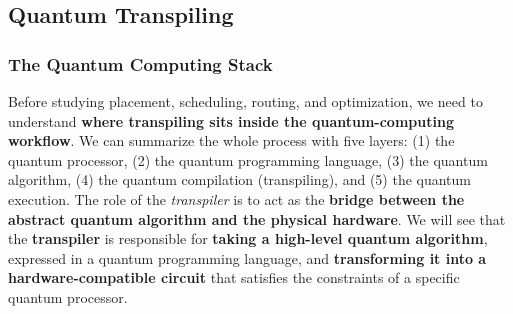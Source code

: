 \subsection{Quantum Transpiling}

\subsubsection{The Quantum Computing Stack}

Before studying placement, scheduling, routing, and optimization, we need to understand \textbf{where transpiling sits inside the quantum-computing workflow}. We can summarize the whole process with five layers: (1) the quantum processor, (2) the quantum programming language, (3) the quantum algorithm, (4) the quantum compilation (transpiling), and (5) the quantum execution. The role of the \emph{transpiler} is to act as the \textbf{bridge between the abstract quantum algorithm and the physical hardware}. We will see that the \textbf{transpiler} is responsible for \textbf{taking a high-level quantum algorithm}, expressed in a quantum programming language, and \textbf{transforming it into a hardware-compatible circuit} that satisfies the constraints of a specific quantum processor.

